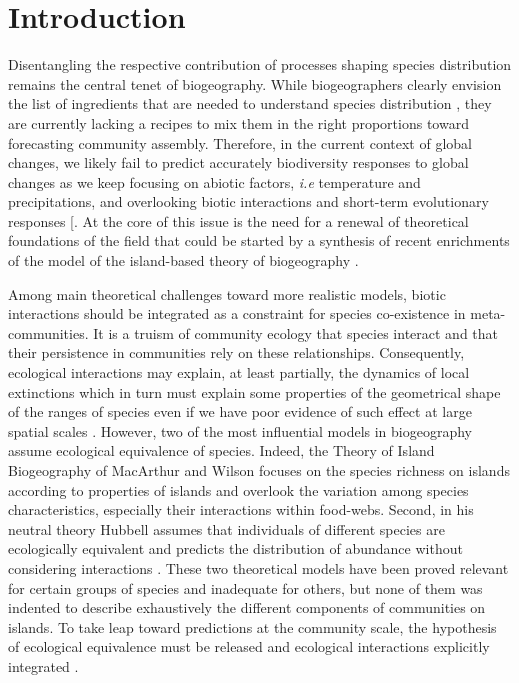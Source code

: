 \section{Introduction}\label{introduction}

Disentangling the respective contribution of processes shaping species
distribution remains the central tenet of biogeography. While
biogeographers clearly envision the list of ingredients that are needed
to understand species distribution \citep{Thuiller2013}, they are
currently lacking a recipes to mix them in the right proportions toward
forecasting community assembly. Therefore, in the current context of
global changes, we likely fail to predict accurately biodiversity
responses to global changes as we keep focusing on abiotic factors,
\emph{i.e} temperature and precipitations, and overlooking biotic
interactions and short-term evolutionary responses
{[}\citet{Lavergne2010}. At the core of this issue is the need for a
renewal of theoretical foundations of the field that could be started by
a synthesis of recent enrichments of the model of the island-based
theory of biogeography \citep{Lomolino2000a, Warren2015}.

Among main theoretical challenges toward more realistic models, biotic
interactions should be integrated as a constraint for species
co-existence in meta-communities. It is a truism of community ecology
that species interact and that their persistence in communities rely on
these relationships. Consequently, ecological interactions may explain,
at least partially, the dynamics of local extinctions which in turn must
explain some properties of the geometrical shape of the ranges of
species \citep{Holt2009, Cazelles2015b} even if we have poor evidence of
such effect at large spatial scales \citep[but see][]{Gotelli2010}.
However, two of the most influential models in biogeography assume
ecological equivalence of species. Indeed, the Theory of Island
Biogeography of MacArthur and Wilson \citep[hereafter
TIB,][]{MacArthur1967} focuses on the species richness on islands
according to properties of islands and overlook the variation among
species characteristics, especially their interactions within food-webs.
Second, in his neutral theory Hubbell assumes that individuals of
different species are ecologically equivalent and predicts the
distribution of abundance without considering interactions
\citep{Hubbell1997}. These two theoretical models have been proved
relevant for certain groups of species and inadequate for others, but
none of them was indented to describe exhaustively the different
components of communities on islands. To take leap toward predictions at
the community scale, the hypothesis of ecological equivalence must be
released and ecological interactions explicitly integrated
\citep{Holt2010}.

